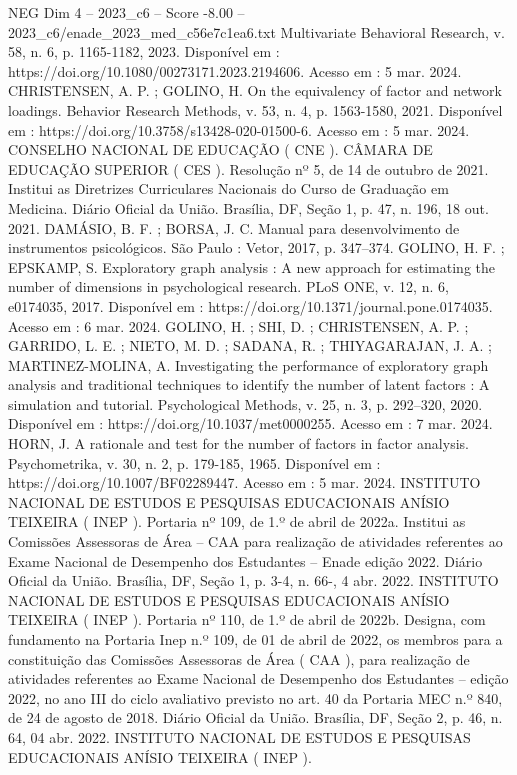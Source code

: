 \begin{textsample}{NEG Dim 4 – 2023\_c6 – Score -8.00 – 2023\_c6/enade\_2023\_med\_c56e7c1ea6.txt}
Multivariate Behavioral Research, v. 58, n. 6, p. 1165-1182, 2023.
Disponível em : https://doi.org/10.1080/00273171.2023.2194606.
Acesso em : 5 mar. 2024.
CHRISTENSEN, A.
P. ; GOLINO, H.
On the equivalency of factor and network loadings.
Behavior Research Methods, v. 53, n. 4, p. 1563-1580, 2021.
Disponível em : https://doi.org/10.3758/s13428-020-01500-6.
Acesso em : 5 mar. 2024.
CONSELHO NACIONAL DE EDUCAÇÃO ( CNE ).
CÂMARA DE EDUCAÇÃO SUPERIOR ( CES ).
Resolução nº 5, de 14 de outubro de 2021.
Institui as Diretrizes Curriculares Nacionais do Curso de Graduação em Medicina.
Diário Oficial da União.
Brasília, DF, Seção 1, p. 47, n. 196, 18 out. 2021.
DAMÁSIO, B.
F. ; BORSA, J.
C.
Manual para desenvolvimento de instrumentos psicológicos.
São Paulo : Vetor, 2017, p. 347–374.
GOLINO, H.
F. ; EPSKAMP, S.
Exploratory graph analysis : A new approach for estimating the number of dimensions in psychological research.
PLoS ONE, v. 12, n. 6, e0174035, 2017.
Disponível em : https://doi.org/10.1371/journal.pone.0174035.
Acesso em : 6 mar. 2024.
GOLINO, H. ; SHI, D. ; CHRISTENSEN, A.
P. ; GARRIDO, L.
E. ; NIETO, M.
D. ; SADANA, R. ; THIYAGARAJAN, J.
A. ; MARTINEZ-MOLINA, A.
Investigating the performance of exploratory graph analysis and traditional techniques to identify the number of latent factors : A simulation and tutorial.
Psychological Methods, v. 25, n. 3, p. 292–320, 2020.
Disponível em : https://doi.org/10.1037/met0000255.
Acesso em : 7 mar. 2024.
HORN, J.
A rationale and test for the number of factors in factor analysis.
Psychometrika, v. 30, n. 2, p. 179-185, 1965.
Disponível em : https://doi.org/10.1007/BF02289447.
Acesso em : 5 mar. 2024.
INSTITUTO NACIONAL DE ESTUDOS E PESQUISAS EDUCACIONAIS ANÍSIO TEIXEIRA ( INEP ).
Portaria nº 109, de 1.º de abril de 2022a.
Institui as Comissões Assessoras de Área – CAA para realização de atividades referentes ao Exame Nacional de Desempenho dos Estudantes – Enade edição 2022.
Diário Oficial da União.
Brasília, DF, Seção 1, p. 3-4, n. 66-, 4 abr. 2022.
INSTITUTO NACIONAL DE ESTUDOS E PESQUISAS EDUCACIONAIS ANÍSIO TEIXEIRA ( INEP ).
Portaria nº 110, de 1.º de abril de 2022b.
Designa, com fundamento na Portaria Inep n.º 109, de 01 de abril de 2022, os membros para a constituição das Comissões Assessoras de Área ( CAA ), para realização de atividades referentes ao Exame Nacional de Desempenho dos Estudantes – edição 2022, no ano III do ciclo avaliativo previsto no art. 40 da Portaria MEC n.º 840, de 24 de agosto de 2018.
Diário Oficial da União.
Brasília, DF, Seção 2, p. 46, n. 64, 04 abr. 2022.
INSTITUTO NACIONAL DE ESTUDOS E PESQUISAS EDUCACIONAIS ANÍSIO TEIXEIRA ( INEP ).

\end{textsample}
